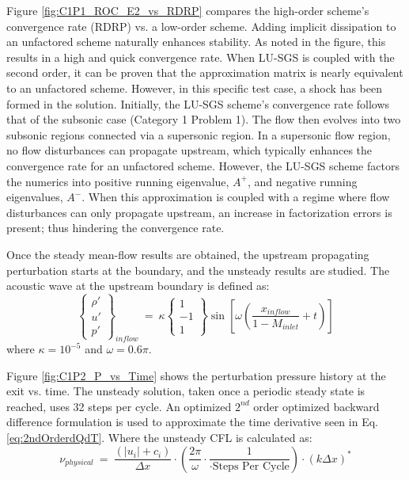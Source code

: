 \documentclass[conf]{new-aiaa}
\begin{document}
Figure \ref{fig:C1P1_ROC_E2_vs_RDRP} compares the high-order scheme's convergence rate (RDRP) vs. a low-order scheme. 
Adding implicit dissipation to an unfactored scheme naturally enhances stability. 
As noted in the figure, this results in a high and quick convergence rate. 
When LU-SGS is coupled with the second order, it can be proven that the approximation matrix is nearly equivalent to an unfactored scheme. 
However, in this specific test case, a shock has been formed in the solution. 
Initially, the LU-SGS scheme's convergence rate follows that of the subsonic case (Category 1 Problem 1). 
The flow then evolves into two subsonic regions connected via a supersonic region. 
In a supersonic flow region, no flow disturbances can propagate upstream, which typically enhances the convergence rate for an unfactored scheme.
However, the LU-SGS scheme factors the numerics into positive running eigenvalue, $A^+$, and negative running eigenvalues, $A^-$. 
When this approximation is coupled with a regime where flow disturbances can only propagate upstream, an increase in factorization errors is present; thus hindering the convergence rate. 

Once the steady mean-flow results are obtained, the upstream propagating perturbation starts at the boundary, and the unsteady results are studied.  
The acoustic wave at the upstream boundary is defined as:
\begin{equation*}
	\left\{
	\begin{matrix}
		{\rho}' \\
		{u}' \\
		{p}'
	\end{matrix}
	\right\}_{inflow}~=~
\kappa
	\left\{
	\begin{matrix}
		1 \\
		-1 \\
		1
	\end{matrix}
	\right\}\sin\left[\omega\left(\frac{x_{inflow}}{1-M_{inlet}}+t\right)\right]
\end{equation*}
where $\kappa=10^{-5}$ and $\omega=0.6\pi$. 

Figure \ref{fig:C1P2_P_vs_Time} shows the perturbation pressure history at the exit vs. time. 
The unsteady solution, taken once a periodic steady state is reached, uses 32 steps per cycle. An optimized $2^{nd}$ order optimized backward difference formulation \cite{HixonImplicit} is used to approximate the time derivative seen in Eq. \eqref{eq:2ndOrderdQdT}. 
Where the unsteady CFL is calculated as:
\begin{equation*}
	\nu_{physical}
  			~=~\frac{\left(\left|u_i\right|+c_i\right)}{\Delta{x}}\cdot\left(\frac{2\pi}{\omega}\cdot\frac{1}{\cdot \text{Steps~Per~Cycle}}\right)\cdot\left(k\Delta{x}\right)^*
\end{equation*}
\end{document}
